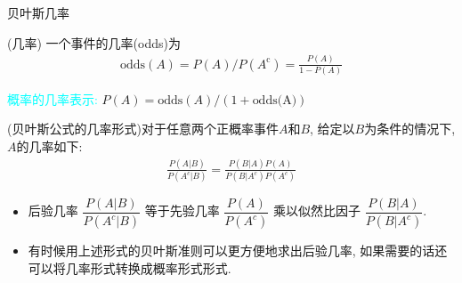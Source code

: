 \begin{frame}{贝叶斯几率}
    \begin{defi}({\tc 几率}) 一个事件的几率(odds)为
    \begin{eqnarray*}
     ​\text{odds}(A)=P(A)/P(A^{\mathrm{c}})=\frac{P(A)}{1-P(A)}
     \end{eqnarray*}
    \end{defi}
  \pause
  \textcolor{cyan}{概率的几率表示:} $P(A)=\text{odds}(A)/(1+\text{odds(A)}) $
  \begin{thm} ({\tc 贝叶斯公式的几率形式})对于任意两个正概率事件$A$和$B$, 给定以$B$为条件的情况下, $A$的几率如下:
   \begin{eqnarray*}
    \frac{P(A|B)}{P(A^c| B)}=\frac{P(B| A)P(A)}{P(B| A^c)P(A^c)}
    \end{eqnarray*}
    \end{thm}
  \pause

  \begin{itemize}[<+-|alert@+>]
  \item 后验几率 $\dfrac{P(A|B)}{P(A^c|B)}$ 等于先验几率 $\dfrac{P(A)}{P(A^c)}$ 乘以似然比因子 $\dfrac{P(B|A)}{P(B|A^c)}$. %
  \item 有时候用上述形式的贝叶斯准则可以更方便地求出后验几率, 如果需要的话还可以将几率形式转换成概率形式形式.
  \end{itemize}


\end{frame}




